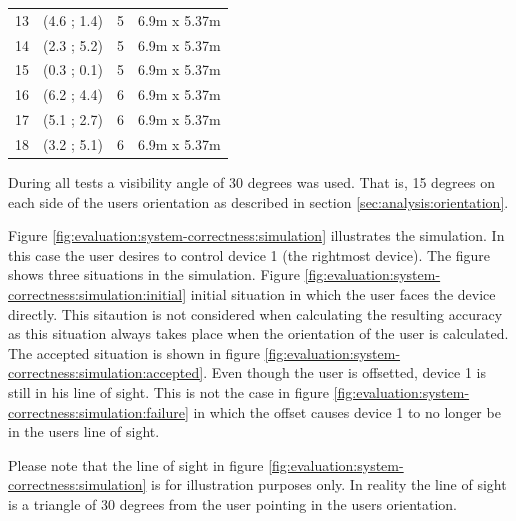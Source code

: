 \begin{table}[!hbt]
\begin{tabular}{c|ccc}
13          & (4.6 ; 1.4)       & 5                          & 6.9m x 5.37m       \\
14          & (2.3 ; 5.2)       & 5                          & 6.9m x 5.37m       \\
15          & (0.3 ; 0.1)       & 5                          & 6.9m x 5.37m       \\
16          & (6.2 ; 4.4)       & 6                          & 6.9m x 5.37m       \\
17          & (5.1 ; 2.7)       & 6                          & 6.9m x 5.37m       \\
18          & (3.2 ; 5.1)       & 6                          & 6.9m x 5.37m      
\end{tabular}
\end{table}

During all tests a visibility angle of 30 degrees was used. That is, 15 degrees on each side of the users orientation as described in section \ref{sec:analysis:orientation}.

Figure \ref{fig:evaluation:system-correctness:simulation} illustrates the simulation. In this case the user desires to control device 1 (the rightmost device). The figure shows three situations in the simulation. Figure \ref{fig:evaluation:system-correctness:simulation:initial} initial situation in which the user faces the device directly. This sitaution is not considered when calculating the resulting accuracy as this situation always takes place when the orientation of the user is calculated. The accepted situation is shown in figure \ref{fig:evaluation:system-correctness:simulation:accepted}. Even though the user is offsetted, device 1 is still in his line of sight. This is not the case in figure \ref{fig:evaluation:system-correctness:simulation:failure} in which the offset causes device 1 to no longer be in the users line of sight.

Please note that the line of sight in figure \ref{fig:evaluation:system-correctness:simulation} is for illustration purposes only. In reality the line of sight is a triangle of 30 degrees from the user pointing in the users orientation.

